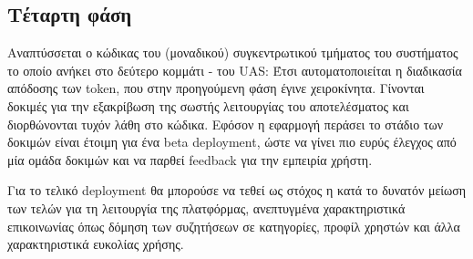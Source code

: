 \subsection{Τέταρτη φάση}

Αναπτύσσεται ο κώδικας του (μοναδικού) συγκεντρωτικού τμήματος του συστήματος το οποίο ανήκει στο δεύτερο κομμάτι - του UAS: Έτσι αυτοματοποιείται η διαδικασία απόδοσης των token, που στην προηγούμενη φάση έγινε χειροκίνητα.
Γίνονται δοκιμές για την εξακρίβωση της σωστής λειτουργίας του αποτελέσματος και διορθώνονται τυχόν λάθη στο κώδικα.
Εφόσον η εφαρμογή περάσει το στάδιο των δοκιμών είναι έτοιμη για ένα beta deployment, ώστε να γίνει πιο ευρύς έλεγχος από μία ομάδα δοκιμών και να παρθεί feedback για την εμπειρία χρήστη.

Για το τελικό deployment θα μπορούσε να τεθεί ως στόχος η κατά το δυνατόν μείωση των τελών για τη λειτουργία της πλατφόρμας, ανεπτυγμένα χαρακτηριστικά επικοινωνίας όπως δόμηση των συζητήσεων σε κατηγορίες, προφίλ χρηστών και άλλα χαρακτηριστικά ευκολίας χρήσης.
